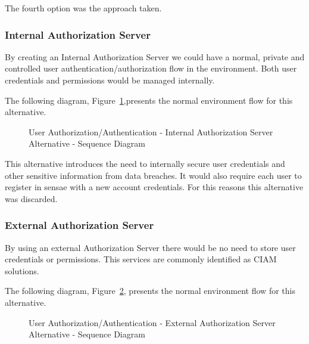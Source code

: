 The fourth option was the approach taken.

\subsubsection*{Internal Authorization Server}
\label{subsubsec:design:alternatives:auth:internalauth}

By creating an Internal Authorization Server we could have a normal, private and controlled user authentication/authorization flow in the environment. Both user credentials and permissions would be managed internally.

The following diagram, Figure~\ref{fig:design:alternatives:auth:internalauth:diagram},presents the normal environment flow for this alternative.

\begin{figure}[H]
   \centering
   \resizebox{\columnwidth}{!}
   {
      
   }
   \caption[User Authorization/Authentication - Internal Authorization Server Alternative - Sequence Diagram]{User Authorization/Authentication - Internal Authorization Server Alternative - Sequence Diagram}
   \label{fig:design:alternatives:auth:internalauth:diagram}
\end{figure}

This alternative introduces the need to internally secure user credentials and other sensitive information from data breaches. It would also require each user to register in sensae with a new account credentials. For this reasons this alternative was discarded.

\subsubsection*{External Authorization Server}
\label{subsubsec:design:alternatives:auth:externalauth}

By using an external Authorization Server there would be no need to store user credentials or permissions. This services are commonly identified as \gls{CIAM} solutions.

The following diagram, Figure~\ref{fig:design:alternatives:auth:externalauth:diagram}, presents the normal environment flow for this alternative.

\begin{figure}[H]
   \centering
   \resizebox{\columnwidth}{!}
   {
      
   }
   \caption[User Authorization/Authentication - External Authorization Server Alternative - Sequence Diagram]{User Authorization/Authentication - External Authorization Server Alternative - Sequence Diagram}
   \label{fig:design:alternatives:auth:externalauth:diagram}
\end{figure}


